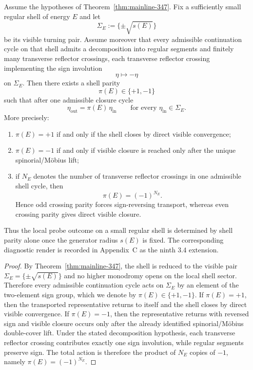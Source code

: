 \begin{theorem}
\label{thm:mainline-348}
Assume the hypotheses of Theorem~\ref{thm:mainline-347}. Fix a sufficiently small regular shell of energy $E$ and let
\[
  \Sigma_E:=\{\pm\sqrt{s(E)}\}
\]
be its visible turning pair. Assume moreover that every admissible continuation cycle on that shell admits a decomposition into regular segments and finitely many transverse reflector crossings, each transverse reflector crossing implementing the sign involution
\[
  \eta\longmapsto -\eta
\]
on $\Sigma_E$. Then there exists a shell parity
\[
  \pi(E)\in\{+1,-1\}
\]
such that after one admissible closure cycle
\[
  \eta_{\mathrm{out}}=\pi(E)\,\eta_{\mathrm{in}}
\qquad
\text{for every }
\eta_{\mathrm{in}}\in\Sigma_E.
\]
More precisely:
\begin{enumerate}[label=(\roman*)]
  \item $\pi(E)=+1$ if and only if the shell closes by direct visible convergence;
  \item $\pi(E)=-1$ if and only if visible closure is reached only after the unique spinorial/M\"obius lift;
  \item if $N_E$ denotes the number of transverse reflector crossings in one admissible shell cycle, then
  \[
    \pi(E)=(-1)^{N_E}.
  \]
  Hence odd crossing parity forces sign-reversing transport, whereas even crossing parity gives direct visible closure.
\end{enumerate}
Thus the local probe outcome on a small regular shell is determined by shell parity alone once the generator radius $s(E)$ is fixed.
The corresponding diagnostic render is recorded in Appendix~C as the ninth 3.4 extension.
\end{theorem}

\begin{proof}
By Theorem~\ref{thm:mainline-347}, the shell is reduced to the visible pair $\Sigma_E=\{\pm\sqrt{s(E)}\}$ and no higher monodromy opens on the local shell sector. Therefore every admissible continuation cycle acts on $\Sigma_E$ by an element of the two-element sign group, which we denote by $\pi(E)\in\{+1,-1\}$. If $\pi(E)=+1$, then the transported representative returns to itself and the shell closes by direct visible convergence. If $\pi(E)=-1$, then the representative returns with reversed sign and visible closure occurs only after the already identified spinorial/M\"obius double-cover lift. Under the stated decomposition hypothesis, each transverse reflector crossing contributes exactly one sign involution, while regular segments preserve sign. The total action is therefore the product of $N_E$ copies of $-1$, namely $\pi(E)=(-1)^{N_E}$.
\end{proof}



